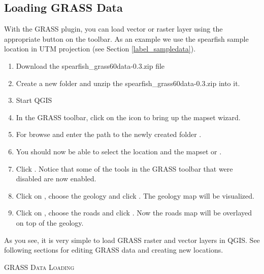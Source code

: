 \subsection{Loading GRASS Data}\label{sec:load_grassdata}

With the GRASS plugin, you can load vector or raster layer using the appropriate button 
on the toolbar. As an example we use the spearfish sample location in UTM projection 
(see Section \ref{label_sampledata}).

\begin{enumerate}
  \item Download the spearfish\_grass60data-0.3.zip file
  \item Create a new folder  and unzip the spearfish\_grass60data-0.3.zip into it. 
  \item Start QGIS
  \item In the GRASS toolbar, click on the  icon to bring up the mapset wizard.
  \item For  browse and enter the path to the newly
  created folder .
  \item You should now be able to select the location 
  and the mapset  or . 
  \item Click . Notice that some of the tools in the GRASS toolbar
  that were disabled are now enabled.
  \item Click on , choose
  the  geology and click . The geology map will be visualized. 
  \item Click on , choose
  the  roads and click . Now the roads map will
  be overlayed on top of the geology.  
\end{enumerate}

As you see, it is very simple to load GRASS raster and vector layers in QGIS. See following sections 
for editing GRASS data and creating new locations.

\begin{Tip}\caption{\textsc{GRASS Data Loading}}
\end{Tip} 

